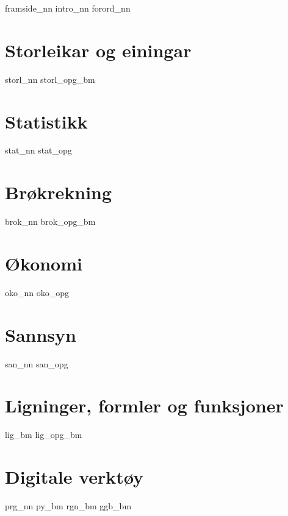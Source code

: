 



\renewcommand*\familydefault{\sfdefault} %

\addto\captionsenglish{\renewcommand{\figurename}{Figur}}
\makeatletter
\addto\captionsenglish{\renewcommand{\chaptername}{Kapittel}}
\addto\captionsenglish{\renewcommand{\contentsname}{Innhold}}




{framside_nn}
{intro_nn}
{forord_nn}
\newpage
\tableofcontents

\chapter{Storleikar og einingar \label{Storlogenh}}
\newpage

{storl_nn}
{storl_opg_bm}

\chapter{Statistikk \label{Statistikk}}
\newpage
{stat_nn}
{stat_opg}

\chapter{Brøkrekning \label{BrokAM}}
\newpage
{brok_nn}
\newpage
{brok_opg_bm}

\chapter{Økonomi \label{Okonomi}}
\newpage
{oko_nn}
{oko_opg}

\chapter{Sannsyn \label{Sannsyn}} 
\newpage
{san_nn}
{san_opg}

\chapter{Ligninger, formler og funksjoner \label{LigningerAM}}
\newpage
{lig_bm} %
{lig_opg_bm}

\chapter{Digitale verktøy \label{Dig}}
{prg_nn}
{py_bm}
{rgn_bm}	
{ggb_bm}	

